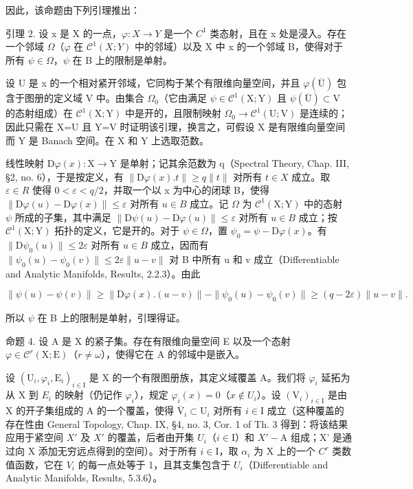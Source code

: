 因此，该命题由下列引理推出：

引理 2. 设 x 是 X 的一点，\(\varphi: X \to Y\) 是一个 \(C^{1}\) 类态射，且在 x 处是浸入。存在一个邻域 \(\Omega\)（\(\varphi\) 在 \(\mathcal{C}^{1}(X;Y)\) 中的邻域）以及 X 中 x 的一个邻域 B，使得对于所有 \(\psi \in \Omega\)，\(\psi\) 在 B 上的限制是单射。

设 U 是 x 的一个相对紧开邻域，它同构于某个有限维向量空间，并且 \(\varphi(\overline{\mathrm{U}})\) 包含于图册的定义域 V 中。由集合 \(\Omega_{0}\)（它由满足 \(\psi\in\mathcal{C}^{1}(\mathrm{X};\mathrm{Y})\) 且 \(\psi(\overline{\mathrm{U}})\subset\mathrm{V}\) 的态射组成）在 \(\mathcal{C}^{1}(\mathrm{X};\mathrm{Y})\) 中是开的，且限制映射 \(\Omega_{0}\to\mathcal{C}^{1}(\mathrm{U};\mathrm{V})\) 是连续的；因此只需在 X=U 且 Y=V 时证明该引理，换言之，可假设 X 是有限维向量空间而 Y 是 Banach 空间。在 X 和 Y 上选取范数。

线性映射 \(\mathrm{D}\varphi(x):\mathrm{X}\to\mathrm{Y}\) 是单射；记其余范数为 q（Spectral Theory, Chap. III, §2, no. 6），于是按定义，有 \(\|\mathrm{D}\varphi(x).t\|\geq q\|t\|\) 对所有 \(t\in X\) 成立。取 \(\varepsilon\in R\) 使得 \(0<\varepsilon<q/2\)，并取一个以 x 为中心的闭球 B，使得 \(\|\mathrm{D}\varphi(u)-\mathrm{D}\varphi(x)\|\leq\varepsilon\) 对所有 \(u\in B\) 成立。记 \(\Omega\) 为 \(\mathcal{C}^{1}(\mathrm{X};\mathrm{Y})\) 中的态射 \(\psi\) 所成的子集，其中满足 \(\|\mathrm{D}\psi(u)-\mathrm{D}\varphi(u)\|\leq\varepsilon\) 对所有 \(u\in B\) 成立；按 \(\mathcal{C}^{1}(\mathrm{X};\mathrm{Y})\) 拓扑的定义，它是开的。对于 \(\psi\in\Omega\)，置 \(\psi_{0}=\psi-\mathrm{D}\varphi(x)\)。有 \(\|\mathrm{D}\psi_{0}(u)\|\leq2\varepsilon\) 对所有 \(u\in B\) 成立，因而有 \(\|\psi_{0}(u)-\psi_{0}(v)\|\leq2\varepsilon\|u-v\|\) 对 B 中所有 u 和 v 成立（Differentiable and Analytic Manifolds, Results, 2.2.3）。由此

\[
\| \psi (u) - \psi (v) \| \geq \| \mathrm{D} \varphi (x). (u - v) \| - \| \psi_ {0} (u) - \psi_ {0} (v) \| \geq (q - 2 \varepsilon) \| u - v \|.
\]

所以 \(\psi\) 在 B 上的限制是单射，引理得证。

命题 4. 设 A 是 X 的紧子集。存在有限维向量空间 E 以及一个态射 \(\varphi \in \mathcal{C}^r (\mathrm{X};\mathrm{E})\)（\(r\neq \omega\)），使得它在 A 的邻域中是嵌入。

设 \((\mathrm{U}_{i},\varphi_{i},\mathrm{E}_{i})_{i\in\mathrm{I}}\) 是 X 的一个有限图册族，其定义域覆盖 A。我们将 \(\varphi_{i}\) 延拓为从 X 到 \(E_{i}\) 的映射（仍记作 \(\varphi_{i}\)），规定 \(\varphi_{i}(x)=0\)（\(x\notin U_{i}\)）。设 \((\mathrm{V}_{i})_{i\in\mathrm{I}}\) 是由 X 的开子集组成的 A 的一个覆盖，使得 \(\overline{\mathrm{V}}_{i}\subset\mathrm{U}_{i}\) 对所有 \(i\in\mathrm{I}\) 成立（这种覆盖的存在性由 General Topology, Chap. IX, §4, no. 3, Cor. 1 of Th. 3 得到：将该结果应用于紧空间 \(X'\) 及 \(X'\) 的覆盖，后者由开集 \(U_{i}\)（\(i\in\mathrm{I}\)）和 \(X'-\mathrm{A}\) 组成；X' 是通过向 X 添加无穷远点得到的空间）。对于所有 \(i\in\mathrm{I}\)，取 \(\alpha_{i}\) 为 X 上的一个 \(C^{r}\) 类数值函数，它在 \(V_{i}\) 的每一点处等于 1，且其支集包含于 \(U_{i}\)（Differentiable and Analytic Manifolds, Results, 5.3.6）。

